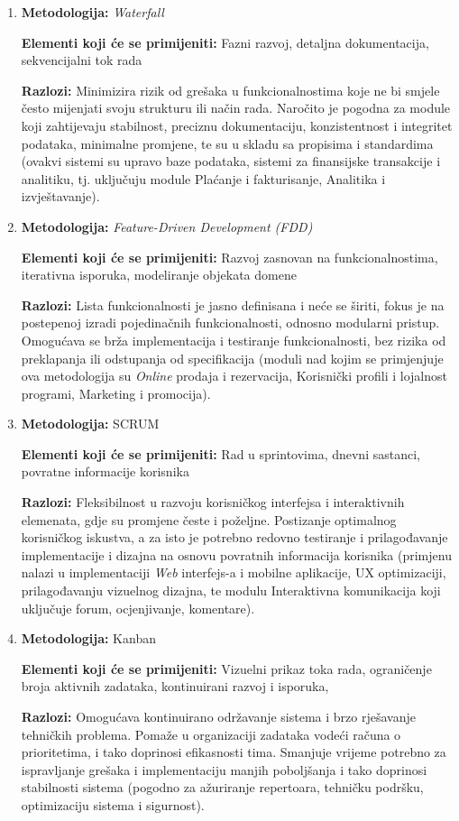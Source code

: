 \begin{enumerate}
    \item \textbf{Metodologija:} \textit{Waterfall} 

    
    \textbf{Elementi koji će se primijeniti:} Fazni razvoj, detaljna dokumentacija, sekvencijalni tok rada 

    
    \textbf{Razlozi:} Minimizira rizik od grešaka u funkcionalnostima koje ne bi smjele često mijenjati svoju strukturu ili način rada. Naročito je pogodna za module koji zahtijevaju stabilnost, preciznu dokumentaciju, konzistentnost i integritet podataka, minimalne promjene, te su u skladu sa propisima i standardima (ovakvi sistemi su upravo baze podataka, sistemi za finansijske transakcije i analitiku, tj. uključuju module Plaćanje i fakturisanje, Analitika i izvještavanje).

    \item \textbf{Metodologija:} \textit{Feature-Driven Development (FDD)} 

    
    \textbf{Elementi koji će se primijeniti:} Razvoj zasnovan na funkcionalnostima, iterativna isporuka, modeliranje objekata domene

    
    \textbf{Razlozi:} Lista funkcionalnosti je jasno definisana i neće se širiti, fokus je na postepenoj izradi pojedinačnih funkcionalnosti, odnosno modularni pristup. Omogućava se brža implementacija i testiranje funkcionalnosti, bez rizika od preklapanja ili odstupanja od specifikacija (moduli nad kojim se primjenjuje ova metodologija su \textit{Online} prodaja i rezervacija, Korisnički profili i lojalnost programi, Marketing i promocija).

    \item \textbf{Metodologija:} SCRUM 

    
    \textbf{Elementi koji će se primijeniti:} Rad u sprintovima, dnevni sastanci, povratne informacije korisnika 

    
    \textbf{Razlozi:} Fleksibilnost u razvoju korisničkog interfejsa i interaktivnih elemenata, gdje su promjene česte i poželjne. Postizanje optimalnog korisničkog iskustva, a za isto je potrebno redovno testiranje i prilagođavanje implementacije i dizajna na osnovu povratnih informacija korisnika (primjenu nalazi u implementaciji \textit{Web} interfejs-a i mobilne aplikacije, UX optimizaciji, prilagođavanju vizuelnog dizajna, te modulu Interaktivna komunikacija koji uključuje forum, ocjenjivanje, komentare).

    \item \textbf{Metodologija:} Kanban 

    
    \textbf{Elementi koji će se primijeniti:} Vizuelni prikaz toka rada, ograničenje broja aktivnih zadataka, kontinuirani razvoj i isporuka, 

    
    \textbf{Razlozi:} Omogućava kontinuirano održavanje sistema i brzo rješavanje tehničkih problema. Pomaže u organizaciji zadataka vodeći računa o prioritetima, i tako doprinosi efikasnosti tima. Smanjuje vrijeme potrebno za ispravljanje grešaka i implementaciju manjih poboljšanja i tako doprinosi stabilnosti sistema (pogodno za ažuriranje repertoara, tehničku podršku, optimizaciju sistema i sigurnost).
\end{enumerate}
